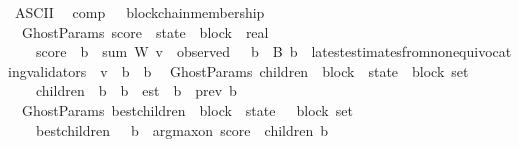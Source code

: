 \begin{isabellebody}
\isanewline
{}\isamarkupfalse%
\ {\isacharparenleft}ASCII{\isacharparenright}\isanewline
\ \ comp\ \ {\isacharparenleft}\ {\isachardoublequoteopen}blockchain{\isacharunderscore}membership{\isachardoublequoteclose}\ {}{}{\isacharparenright}\isanewline
\isanewline
\isanewline
{}\isamarkupfalse%
\ {\isacharparenleft}\ GhostParams{\isacharparenright}\ score\ {\isacharcolon}{\isacharcolon}\ {\isachardoublequoteopen}state\ {\isasymRightarrow}\ block\ {\isasymRightarrow}\ real{\isachardoublequoteclose}\isanewline
\ \ \isanewline
\ \ \ \ {\isachardoublequoteopen}score\ {\isasymsigma}\ b\ {\isacharequal}\ sum\ W\ {\isacharbraceleft}v\ {\isasymin}\ observed\ {\isasymsigma}{\isachardot}\ {\isasymexists}\ b{\isacharprime}\ {\isasymin}\ B{\isachardot}\ b{\isacharprime}\ {\isasymin}\ {\isacharparenleft}latest{\isacharunderscore}estimates{\isacharunderscore}from{\isacharunderscore}non{\isacharunderscore}equivocating{\isacharunderscore}validators\ {\isasymsigma}\ v{\isacharparenright}\ {\isasymand}\ {\isacharparenleft}b\ {\isasymdownharpoonright}\ b{\isacharprime}{\isacharparenright}{\isacharbraceright}{\isachardoublequoteclose}\isanewline
\isanewline
\isanewline
{}\isamarkupfalse%
\ {\isacharparenleft}\ GhostParams{\isacharparenright}\ children\ {\isacharcolon}{\isacharcolon}\ {\isachardoublequoteopen}block\ {\isacharasterisk}\ state\ {\isasymRightarrow}\ block\ set{\isachardoublequoteclose}\isanewline
\ \ \isanewline
\ \ \ \ {\isachardoublequoteopen}children\ {\isacharequal}\ {\isacharparenleft}{\isasymlambda}{\isacharparenleft}b{\isacharcomma}\ {\isasymsigma}{\isacharparenright}{\isachardot}\ {\isacharbraceleft}b{\isacharprime}\ {\isasymin}\ est\ {\isacharbackquote}{\isasymsigma}{\isachardot}\ b\ {\isacharequal}\ prev\ b{\isacharprime}{\isacharbraceright}{\isacharparenright}{\isachardoublequoteclose}\isanewline
\isanewline
\isanewline
{}\isamarkupfalse%
\ {\isacharparenleft}\ GhostParams{\isacharparenright}\ best{\isacharunderscore}children\ {\isacharcolon}{\isacharcolon}\ {\isachardoublequoteopen}block\ {\isacharasterisk}\ state\ {\isasymRightarrow}\ \ block\ set{\isachardoublequoteclose}\isanewline
\ \ \isanewline
\ \ \ \ {\isachardoublequoteopen}best{\isacharunderscore}children\ {\isacharequal}\ {\isacharparenleft}{\isasymlambda}\ {\isacharparenleft}b{\isacharcomma}\ {\isasymsigma}{\isacharparenright}{\isachardot}\ {\isacharbraceleft}arg{\isacharunderscore}max{\isacharunderscore}on\ {\isacharparenleft}score\ {\isasymsigma}{\isacharparenright}\ {\isacharparenleft}children\ {\isacharparenleft}b{\isacharcomma}\ {\isasymsigma}{\isacharparenright}{\isacharparenright}{\isacharbraceright}{\isacharparenright}{\isachardoublequoteclose}\isanewline

\end{isabellebody}
